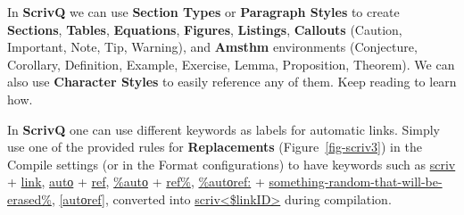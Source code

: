 \documentclass[
  12pt,
  a4paper,
  oneside,
  numbers=noenddot,
  titlepage,
  toclink=all,
  toc=bibliography]{scrbook}
\theoremstyle{definition}
\theoremstyle{definition}
\theoremstyle{definition}
\theoremstyle{plain}
\theoremstyle{plain}
\theoremstyle{plain}
\theoremstyle{plain}
\theoremstyle{plain}
\theoremstyle{remark}
\begin{document}
\begin{tcolorbox}[enhanced jigsaw, rightrule=.15mm, bottomtitle=1mm, colback=white, toptitle=1mm, left=2mm, colbacktitle=quarto-callout-note-color!10!white, opacitybacktitle=0.6, opacityback=0, arc=.35mm, leftrule=.75mm, toprule=.15mm, titlerule=0mm, breakable, coltitle=black, bottomrule=.15mm, colframe=quarto-callout-note-color-frame, title=\textcolor{quarto-callout-note-color}{\faInfo}\hspace{0.5em}{Translating Quarto into Scrivener}]

In \textbf{ScrivQ} we can use \textbf{Section Types} or
\textbf{Paragraph Styles} to create \textbf{Sections}, \textbf{Tables},
\textbf{Equations}, \textbf{Figures}, \textbf{Listings},
\textbf{Callouts} (Caution, Important, Note, Tip, Warning), and
\textbf{Amsthm} environments (Conjecture, Corollary, Definition,
Example, Exercise, Lemma, Proposition, Theorem). We can also use
\textbf{Character Styles} to easily reference any of them. Keep reading
to learn how.

\end{tcolorbox}

\begin{tcolorbox}[enhanced jigsaw, rightrule=.15mm, bottomtitle=1mm, colback=white, toptitle=1mm, left=2mm, colbacktitle=quarto-callout-tip-color!10!white, opacitybacktitle=0.6, opacityback=0, arc=.35mm, leftrule=.75mm, toprule=.15mm, titlerule=0mm, breakable, coltitle=black, bottomrule=.15mm, colframe=quarto-callout-tip-color-frame, title=\textcolor{quarto-callout-tip-color}{\faLightbulb}\hspace{0.5em}{Choosing your own label for automatic links}]

In \textbf{ScrivQ} one can use different keywords as labels for
automatic links. Simply use one of the provided rules for
\textbf{Replacements}
(\protect\hypertarget{cite_6}{}{\label{cite_6}Figure~\ref{fig-scriv3}})
in the Compile settings (or in the Format configurations) to have
keywords such as \ul{scriv} + \ul{link}, \ul{autο} + \ul{ref},
\ul{\%autο} + \ul{ref\%}, \ul{\%autοref:} +
\ul{something-random-that-will-be-erased\%}, \ul{{[}autοref{]}},
converted into \ul{scriv\textless\$linkID\textgreater{}} during
compilation.

\end{tcolorbox}
\end{document}
